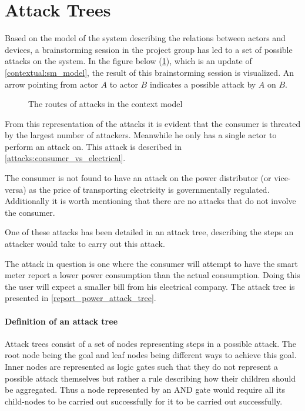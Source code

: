 \section{Attack Trees}
Based on the model of the system describing the relations between actors and devices, a brainstorming session in the project group has led to a set of possible attacks on the system.
In the figure below (\cref{contextual:sm_model_attack}), which is an update of \cref{contextual:sm_model}, the result of this brainstorming session is visualized.
An arrow pointing from actor $A$ to actor $B$ indicates a possible attack by $A$ on $B$.

\begin{figure}[H]
  \centering
  
  \caption{The routes of attacks in the context model}
  \label{contextual:sm_model_attack}
\end{figure}

From this representation of the attacks it is evident that the consumer is threated by the largest number of attackers.
Meanwhile he only has a single actor to perform an attack on.
This attack is described in \cref{attacks:consumer_vs_electrical}.

The consumer is not found to have an attack on the power distributor (or vice-versa) as the price of transporting electricity is governmentally regulated.
Additionally it is worth mentioning that there are no attacks that do not involve the consumer.

One of these attacks has been detailed in an attack tree, describing the steps an attacker would take to carry out this attack.

The attack in question is one where the consumer will attempt to have the smart meter report a lower power consumption than the actual consumption.
Doing this the user will expect a smaller bill from his electrical company.
The attack tree is presented in \cref{report_power_attack_tree}.

\paragraph{Definition of an attack tree}
Attack trees consist of a set of nodes representing steps in a possible attack.
The root node being the goal and leaf nodes being different ways to achieve this goal.
Inner nodes are represented as logic gates such that they do not represent a possible attack themselves but rather a rule describing how their children should be aggregated.
Thus a node represented by an AND gate would require all its child-nodes to be carried out successfully for it to be carried out successfully.

